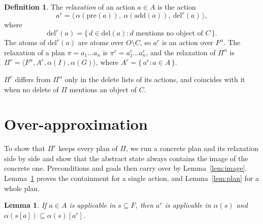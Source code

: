 \documentclass{article}
\theoremstyle{definition}
\newtheorem{definition}{Definition}
\theoremstyle{plain}
\newtheorem{lemma}{Lemma}
\theoremstyle{definition}
\begin{document}
\begin{definition}\label{def:relaxed}
The \emph{relaxation} of an action $a \in A$ is the action
\[
  a^r = \langle\, \alpha(\mathrm{pre}(a)),\ \alpha(\mathrm{add}(a)),\ \mathrm{del}^r(a) \,\rangle,
\]
where 
\[
\mathrm{del}^r(a) = \{\, d \in \mathrm{del}(a) : d \text{ mentions no object of } C \,\}.
\]
The atoms of $\mathrm{del}^r(a)$ are atoms over $O \setminus C$, so $a^r$ is an action over $F^\alpha$.
The relaxation of a plan $\pi = a_1 \dots a_n$ is $\pi^r = a_1^r \dots a_n^r$, and the relaxation of $\Pi^\alpha$ is $\Pi^r = \langle F^\alpha, A^r, \alpha(I), \alpha(G) \rangle$, where $A^r = \{\, a^r : a \in A \,\}$.
\end{definition}

$\Pi^r$ differs from $\Pi^\alpha$ only in the delete lists of its actions, and coincides with it when no delete of $\Pi$ mentions an object of $C$.

\section{Over-approximation}

To show that $\Pi^r$ keeps every plan of $\Pi$, we run a concrete plan and its relaxation side by side and show that the abstract state always contains the image of the concrete one. Preconditions and goals then carry over by Lemma~\ref{lem:image}. Lemma~\ref{lem:progress} proves the containment for a single action, and Lemma~\ref{lem:plan} for a whole plan.

\begin{lemma}\label{lem:progress}
If $a \in A$ is applicable in $s \subseteq F$, then $a^r$ is applicable in $\alpha(s)$ and $\alpha(s[a]) \subseteq \alpha(s)[a^r]$.
\end{lemma}
\end{document}
